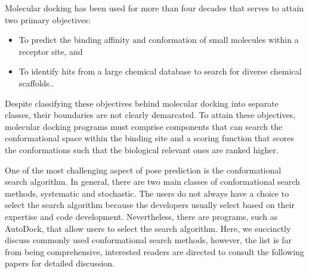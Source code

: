 \documentclass[10pt, a4paper]{book}
\begin{document}
Molecular docking has been used for more than four decades that serves to attain two primary objectives:
\begin{itemize}
    \item To predict the binding affinity and conformation of small molecules within a receptor site, and 
    \item To identify hits from a large chemical database to search for diverse chemical scaffolds.\cite{bib1}. 
\end{itemize}

Despite classifying these objectives behind molecular docking into separate classes, their boundaries are not clearly demarcated. To attain these objectives, molecular docking programs must comprise components that can search the conformational space within the binding site and a scoring function that scores the conformations such that the biological relevant ones are ranked higher.



One of the most challenging aspect of pose prediction is the conformational search algorithm. In general, there are two main classes of conformational search methods, systematic and stochastic.  The users do not always have a choice to select the search algorithm because the developers usually select based on their expertise and code development. Nevertheless, there are programs, such as AutoDock\cite{bib22}, that allow users to select the search algorithm. Here, we succinctly discuss commonly used conformational search methods, however, the list is far from being comprehensive, interested readers are directed to consult the following papers for detailed discussion\cite{bib17, bib23}. 
\end{document}
